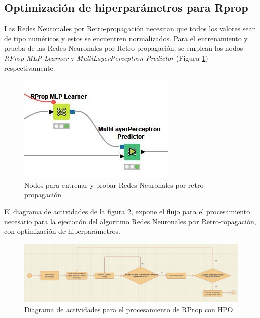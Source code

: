 \subsection{Optimización de hiperparámetros para Rprop}
Las Redes Neuronales por Retro-propagación necesitan que todos los valores sean de tipo numéricos y estos se encuentren normalizados. Para el entrenamiento y prueba de las Redes Neuronales por Retro-propagación, se emplean los nodos \textit{RProp MLP Learner} y \textit{MultiLayerPerceptron Predictor} (Figura \ref{fig:nodos-rprop}) respectivamente.

\begin{figure}[H]
	\centering
	\includegraphics[width=0.4\linewidth]{"figuras/capi 2/nodos-rprop"}
	\caption[Nodos para entrenar y probar Redes Neuronales por retro propagación]{Nodos para entrenar y probar Redes Neuronales por retro-propagación}
	\label{fig:nodos-rprop}
\end{figure}

El diagrama de actividades de la figura \ref{fig:diagrama-act-proc-rprop-hpo}, expone el flujo para el procesamiento necesario para la ejecución del algoritmo Redes Neuronales por Retro-ropagación, con optimización de hiperparámetros.
\begin{figure}[H]
	\centering
	\includegraphics[width=0.7\linewidth]{"figuras/capi 2/diagrama-act-proc-rprop-hpo"}
	\caption[Diagrama de actividades para el procesamiento de RProp con HPO]{Diagrama de actividades para el procesamiento de RProp con HPO}
	\label{fig:diagrama-act-proc-rprop-hpo}
\end{figure}

